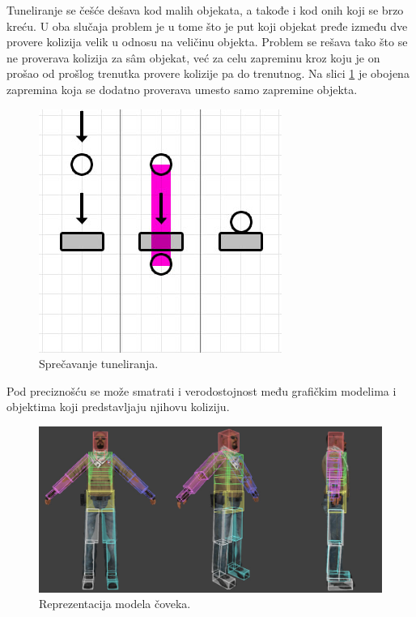 \documentclass[a4paper]{article}
\begin{document}
{Tuneliranje se češće dešava kod malih objekata, a takođe i kod 
onih koji se brzo kreću. U oba slučaja problem je u tome što je put koji objekat pređe između dve provere 
kolizija velik u odnosu na veličinu objekta. 
Problem se rešava tako što se ne proverava kolizija za sâm objekat, već za celu zapreminu kroz koju je on prošao 
od prošlog trenutka provere kolizije pa do trenutnog. Na slici \ref{fig:tunnel_fix} je obojena zapremina 
koja se dodatno proverava umesto samo zapremine objekta.



\begin{figure}[h!]
	\begin{center}
	\includegraphics[scale=0.45]{tunnel_fixed.png}
	\end{center}
	\caption{Sprečavanje tuneliranja.}
	\label{fig:tunnel_fix}
\end{figure}

Pod preciznošću se može smatrati i verodostojnost među grafičkim modelima i objektima koji predstavljaju njihovu koliziju.
\begin{figure}[h!]
	\begin{center}
	\includegraphics[scale=0.45]{hitbox.png}
	\end{center}
	\caption{Reprezentacija modela čoveka.}
	\label{fig:hitbox}
\end{figure}

}
\end{document}
